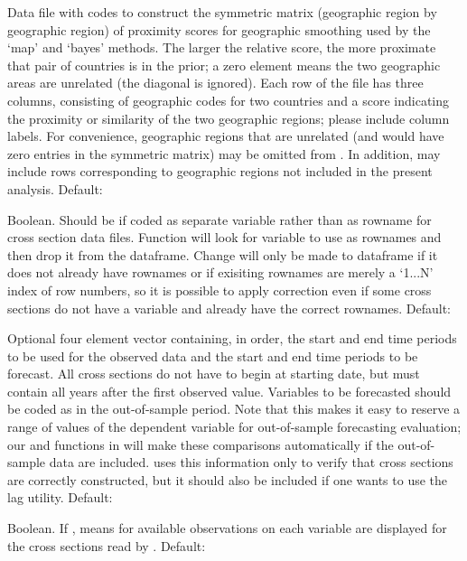 \begin{Arguments}
\begin{ldescription}
\item[\code{adjacency}] Data file with codes to construct the symmetric
matrix (geographic region by geographic region) of proximity
scores for geographic smoothing used by the `map' and `bayes'
methods. The larger the relative score, the more proximate
that pair of countries is in the prior; a zero element means
the two geographic areas are unrelated (the diagonal is
ignored).  Each row of the  file has three
columns, consisting of geographic codes for two countries
and a score indicating the proximity or similarity of the
two geographic regions; please include column labels. For
convenience, geographic regions that are unrelated (and
would have zero entries in the symmetric matrix) may be
omitted from . In addition, 
may include rows corresponding to geographic regions not
included in the present analysis. Default: 

\item[\code{year.var}] Boolean. Should be  if  coded as
separate variable rather than as rowname for cross section
data files.  Function will look for  variable to
use as rownames and then drop it from the dataframe. Change
will only be made to dataframe if it does not already have
rownames or if exisiting rownames are merely a
`1...N' index of row numbers, so it is possible to
apply correction even if some cross sections do not have a
 variable and already have the correct
rownames. Default: 

\item[\code{sample.frame}] Optional four element vector containing, in order,
the start and end time periods to be used for the observed
data and the start and end time periods to be forecast. All
cross sections do not have to begin at starting date, but
must contain all years after the first observed
value. Variables to be forecasted should be coded as
 in the out-of-sample period. Note that this makes
it easy to reserve a range of values of the dependent
variable for out-of-sample forecasting evaluation; our
 and  functions in
 will make these comparisons
automatically if the out-of-sample data are
included.  uses this information only to
verify that cross sections are correctly
constructed, but it should also be included if one wants to
use the lag utility. Default: 

\item[\code{summary}] Boolean. If , means for available
observations on each variable are displayed for the cross
sections read by . Default: 


\end{ldescription}
\end{Arguments}
